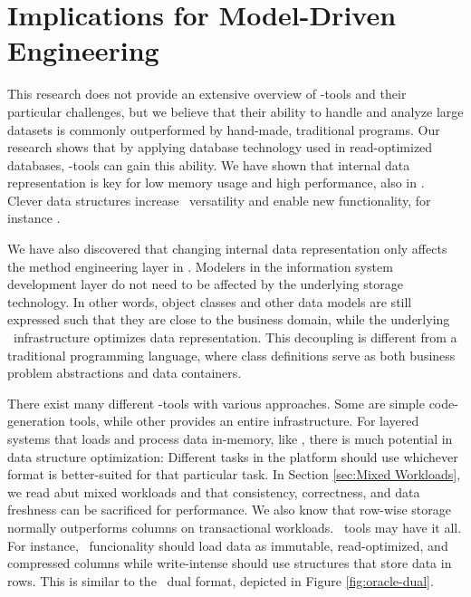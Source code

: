 \section{Implications for Model-Driven Engineering}
\label{sec:Implications for Model-Driven Engineering}
This research does not provide an extensive overview of \mdd-tools and their particular challenges, but we believe that their ability to handle and analyze large datasets is commonly outperformed by hand-made, traditional programs. Our research shows that by applying database technology used in read-optimized databases, \mde-tools can gain this ability. We have shown that internal data representation is key for low memory usage and high performance, also in \mdd. Clever data structures increase \mde~versatility and enable new functionality, for instance \bd.

We have also discovered that changing internal data representation only affects the method engineering layer in \mde. Modelers in the information system development layer do not need to be affected by the underlying storage technology. In other words, object classes and other data models are still expressed such that they are close to the business domain, while the underlying \mde~infrastructure optimizes data representation. This decoupling is different from a traditional programming language, where class definitions serve as both business problem abstractions and data containers.

There exist many different \mdd-tools with various approaches. Some are simple code-generation tools, while other provides an entire infrastructure. For layered systems that loads and process data in-memory, like \gap, there is much potential in data structure optimization: Different tasks in the platform should use whichever format is better-suited for that particular task. In Section \ref{sec:Mixed Workloads}, we read abut mixed workloads and that consistency, correctness, and data freshness can be sacrificed for performance. We also know that row-wise storage normally outperforms columns on transactional workloads. \mde~tools may have it all. For instance, \bd~funcionality should load data as immutable, read-optimized, and compressed columns while write-intense should use structures that store data in rows. This is similar to the \oracle~dual format, depicted in Figure \ref{fig:oracle-dual}.

